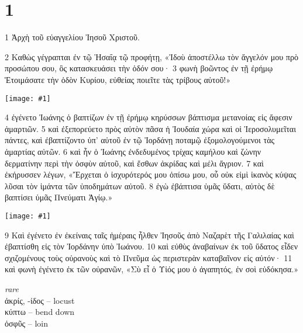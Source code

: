 \documentclass[10pt,a5paper,twoside,twocolumn]{book}
\newcommand{\fig}[1]{\texttt{[image: \#1]}\label{fig:#1}}
\newcommand*\cleartoleftpage{%
  \ifodd\value{page}\hbox{}\clearpage\fi
}
\newenvironment{facing}{\cleartoleftpage}{\clearpage\pagebreak}
\newenvironment{help}{\clearpage}{}
\newenvironment{helpsec}{\begin{minipage}[t]{\textwidth}\begin{multicols}{2}}{\end{multicols}\end{minipage}}
\newenvironment{vocab}{\begin{helpsec}}{\end{helpsec}}
\begin{document}

\chapter{1}

\begin{facing}

1 Ἀρχὴ τοῦ εὐαγγελίου Ἰησοῦ Χριστοῦ.

2 Καθὼς γέγραπται ἐν τῷ Ἡσαΐᾳ τῷ προφήτῃ,
	«Ἰδοὺ ἀποστέλλω τὸν ἄγγελόν μου πρὸ προσώπου σου, 
	ὃς κατασκευάσει τὴν ὁδόν σου·
		3 φωνὴ βοῶντος ἐν τῇ ἐρήμῳ 
	Ἑτοιμάσατε τὴν ὁδὸν Κυρίου, 
	εὐθείας ποιεῖτε τὰς τρίβους αὐτοῦ!»

\fig{01-04} %

4 ἐγένετο Ἰωάνης ὁ βαπτίζων ἐν τῇ ἐρήμῳ κηρύσσων βάπτισμα μετανοίας εἰς ἄφεσιν ἁμαρτιῶν. 5 καὶ ἐξεπορεύετο πρὸς αὐτὸν πᾶσα ἡ Ἰουδαία χώρα καὶ οἱ Ἱεροσολυμεῖται πάντες, καὶ ἐβαπτίζοντο ὑπ’ αὐτοῦ ἐν τῷ Ἰορδάνῃ ποταμῷ ἐξομολογούμενοι τὰς ἁμαρτίας αὐτῶν. 6 καὶ ἦν ὁ Ἰωάνης ἐνδεδυμένος τρίχας καμήλου καὶ ζώνην δερματίνην περὶ τὴν ὀσφὺν αὐτοῦ, καὶ ἔσθων ἀκρίδας καὶ μέλι ἄγριον. 7 καὶ ἐκήρυσσεν λέγων, «Ἔρχεται ὁ ἰσχυρότερός μου ὀπίσω μου, οὗ οὐκ εἰμὶ ἱκανὸς κύψας λῦσαι τὸν ἱμάντα τῶν ὑποδημάτων αὐτοῦ. 8 ἐγὼ ἐβάπτισα ὑμᾶς ὕδατι, αὐτὸς δὲ βαπτίσει ὑμᾶς Πνεύματι Ἁγίῳ.»

\fig{01-09} %

	9 Καὶ ἐγένετο ἐν ἐκείναις ταῖς ἡμέραις ἦλθεν Ἰησοῦς ἀπὸ Ναζαρὲτ τῆς Γαλιλαίας καὶ ἐβαπτίσθη εἰς τὸν Ἰορδάνην ὑπὸ Ἰωάνου. 10 καὶ εὐθὺς ἀναβαίνων ἐκ τοῦ ὕδατος εἶδεν σχιζομένους τοὺς οὐρανοὺς καὶ τὸ Πνεῦμα ὡς περιστερὰν καταβαῖνον εἰς αὐτόν· 
11 καὶ φωνὴ ἐγένετο ἐκ τῶν οὐρανῶν, «Σὺ εἶ ὁ Υἱός μου ὁ ἀγαπητός, ἐν σοὶ εὐδόκησα.»


\begin{help}

\begin{vocab}

\emph{rare}\\
ἀκρίς, -ίδος -- locust \\
κύπτω -- bend down\\
ὀσφῦς -- loin\\


\end{vocab}
\end{help}
\end{facing}
\end{document}
